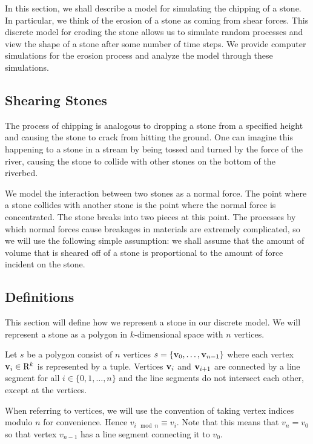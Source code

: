 In this section, we shall describe a model for simulating the chipping of a stone. In particular, we think of the erosion of a stone as coming from shear forces. This discrete model for eroding the stone allows us to simulate random processes and view the shape of a stone after some number of time steps. We provide computer simulations for the erosion process and analyze the model through these simulations.

\subsection{Shearing Stones}

The process of chipping is analogous to dropping a stone from a specified height and causing the stone to crack from hitting the ground. One can imagine this happening to a stone in a stream by being tossed and turned by the force of the river, causing the stone to collide with other stones on the bottom of the riverbed.

We model the interaction between two stones as a normal force. The point where a stone collides with another stone is the point where the normal force is concentrated. The stone breaks into two pieces at this point. The processes by which normal forces cause breakages in materials are extremely complicated, so we will use the following simple assumption: we shall assume that the amount of volume that is sheared off of a stone is proportional to the amount of force incident on the stone.

\subsection{Definitions}

This section will define how we represent a stone in our discrete model. We will represent a stone as a polygon in $k$-dimensional space with $n$ vertices.

\begin{definition}
  Let $s$ be a polygon consist of $n$ vertices $s = \{ \mathbf{v}_0, \ldots, \mathbf{v}_{n-1} \}$ where each vertex $\mathbf{v}_i \in \mathrm{R}^k$ is represented by a tuple. Vertices $\mathbf{v}_i$ and $\mathbf{v}_{i+1}$ are connected by a line segment for all $i \in \{0, 1, \ldots, n \}$ and the line segments do not intersect each other, except at the vertices.
\end{definition}

When referring to vertices, we will use the convention of taking vertex indices modulo $n$ for convenience. Hence $v_{i \mod{n}} \equiv v_i$. Note that this means that $v_{n} = v_{0}$ so that vertex $v_{n-1}$ has a line segment connecting it to $v_{0}$.

